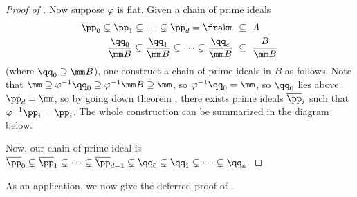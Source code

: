 \begin{proof}[Proof of ]
    Now suppose $\varphi$ is flat. Given a chain of prime ideals
    \begin{align*}
        \pp_0\subsetneq \pp_1\subsetneq\dots\subsetneq \pp_d 
        = \frakm
        \ &\subseteq \ A \\
        \frac{\qq_0}{\mm B}\subsetneq \frac{\qq_1}{\mm B}\subsetneq\dots\subsetneq \frac{\qq_e}{\mm B} 
        \ &\subseteq \ \frac{B}{\mm B}
    \end{align*}
    (where $\qq_0\supseteq \mm B$), one construct 
    a chain of prime ideals in $B$ as follows.
    Note that $\mm \supseteq \varphi^{-1}\qq_0\supseteq \varphi^{-1}\mm B\supseteq \mm$, so
    $\varphi^{-1}\qq_0=\mm$, so $\qq_0$ lies above $\pp_d=\mm$,
    so by going down theorem , 
    there exists prime ideals 
    $\overline{\pp}_i$ such that $\varphi^{-1}\overline\pp_i
    = \pp_i$.
    The whole construction can be summarized
    in the diagram below.
    \begin{center}
    \end{center}
    Now, our chain of prime ideal is 
    $\overline\pp_0\subsetneq \overline\pp_1 
    \subsetneq\dots \subsetneq \overline\pp_{d-1} 
    \subsetneq \qq_0 \subsetneq \qq_1 
    \subsetneq\dots\subsetneq \qq_e$.
\end{proof}
As an application, 
we now give the deferred proof of .
